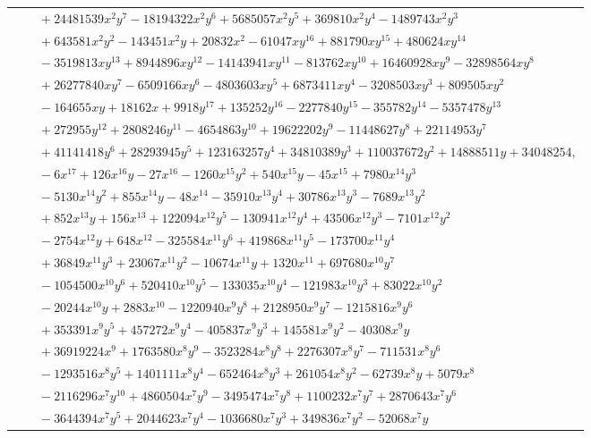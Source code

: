 \documentclass[11pt]{article}
\begin{document}
\begin{longtable}{@{}ll@{}}
 & $\quad +24481539x^{2}y^{7}-18194322x^{2}y^{6}+5685057x^{2}y^{5}+369810x^{2}y^{4}-1489743x^{2}y^{3}$\\
 & $\quad +643581x^{2}y^{2}-143451x^{2}y+20832x^{2}-61047xy^{16}+881790xy^{15}+480624xy^{14}$\\
 & $\quad -3519813xy^{13}+8944896xy^{12}-14143941xy^{11}-813762xy^{10}+16460928xy^{9}-32898564xy^{8}$\\
 & $\quad +26277840xy^{7}-6509166xy^{6}-4803603xy^{5}+6873411xy^{4}-3208503xy^{3}+809505xy^{2}$\\
 & $\quad -164655xy+18162x+9918y^{17}+135252y^{16}-2277840y^{15}-355782y^{14}-5357478y^{13}$\\
 & $\quad +272955y^{12}+2808246y^{11}-4654863y^{10}+19622202y^{9}-11448627y^{8}+22114953y^{7}$\\
 & $\quad +41141418y^{6}+28293945y^{5}+123163257y^{4}+34810389y^{3}+110037672y^{2}+14888511y+34048254,$\\
 & $\quad -6x^{17}+126x^{16}y-27x^{16}-1260x^{15}y^{2}+540x^{15}y-45x^{15}+7980x^{14}y^{3}$\\
 & $\quad -5130x^{14}y^{2}+855x^{14}y-48x^{14}-35910x^{13}y^{4}+30786x^{13}y^{3}-7689x^{13}y^{2}$\\
 & $\quad +852x^{13}y+156x^{13}+122094x^{12}y^{5}-130941x^{12}y^{4}+43506x^{12}y^{3}-7101x^{12}y^{2}$\\
 & $\quad -2754x^{12}y+648x^{12}-325584x^{11}y^{6}+419868x^{11}y^{5}-173700x^{11}y^{4}$\\
 & $\quad +36849x^{11}y^{3}+23067x^{11}y^{2}-10674x^{11}y+1320x^{11}+697680x^{10}y^{7}$\\
 & $\quad -1054500x^{10}y^{6}+520410x^{10}y^{5}-133035x^{10}y^{4}-121983x^{10}y^{3}+83022x^{10}y^{2}$\\
 & $\quad -20244x^{10}y+2883x^{10}-1220940x^{9}y^{8}+2128950x^{9}y^{7}-1215816x^{9}y^{6}$\\
 & $\quad +353391x^{9}y^{5}+457272x^{9}y^{4}-405837x^{9}y^{3}+145581x^{9}y^{2}-40308x^{9}y$\\
 & $\quad +36919224x^{9}+1763580x^{8}y^{9}-3523284x^{8}y^{8}+2276307x^{8}y^{7}-711531x^{8}y^{6}$\\
 & $\quad -1293516x^{8}y^{5}+1401111x^{8}y^{4}-652464x^{8}y^{3}+261054x^{8}y^{2}-62739x^{8}y+5079x^{8}$\\
 & $\quad -2116296x^{7}y^{10}+4860504x^{7}y^{9}-3495474x^{7}y^{8}+1100232x^{7}y^{7}+2870643x^{7}y^{6}$\\
 & $\quad -3644394x^{7}y^{5}+2044623x^{7}y^{4}-1036680x^{7}y^{3}+349836x^{7}y^{2}-52068x^{7}y$\\

\end{longtable}
\end{document}
